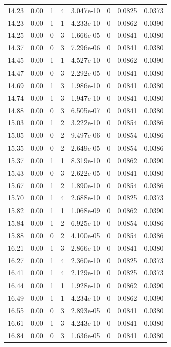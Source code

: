 \documentclass[preview]{standalone}
\begin{document}
{{{\begin{tabular}{L{1.2cm}C{1.2cm} C{0.3cm}C{0.5cm} C{1.4cm}C{1.4cm} C{1.4cm}C{1.4cm}}
  14.23  &  0.00  & 1     &  4 &  3.047e-10  & 0  & 0.0825 &  0.0373   \\ 
  14.23  &  0.00  & 1     &  1 &  4.233e-10  & 0  & 0.0862 &  0.0390   \\ 
  14.25  &  0.00  & 0     &  3 &  1.666e-05  & 0  & 0.0841 &  0.0380   \\ 
  14.37  &  0.00  & 0     &  3 &  7.296e-06  & 0  & 0.0841 &  0.0380   \\ 
  14.45  &  0.00  & 1     &  1 &  4.527e-10  & 0  & 0.0862 &  0.0390   \\ 
  14.47  &  0.00  & 0     &  3 &  2.292e-05  & 0  & 0.0841 &  0.0380   \\ 
  14.69  &  0.00  & 1     &  3 &  1.986e-10  & 0  & 0.0841 &  0.0380   \\ 
  14.74  &  0.00  & 1     &  3 &  1.947e-10  & 0  & 0.0841 &  0.0380   \\ 
  14.88  &  0.00  & 0     &  3 &  6.505e-07  & 0  & 0.0841 &  0.0380   \\ 
  15.03  &  0.00  & 1     &  2 &  3.222e-10  & 0  & 0.0854 &  0.0386   \\ 
  15.05  &  0.00  & 0     &  2 &  9.497e-06  & 0  & 0.0854 &  0.0386   \\ 
  15.35  &  0.00  & 0     &  2 &  2.649e-05  & 0  & 0.0854 &  0.0386   \\ 
  15.37  &  0.00  & 1     &  1 &  8.319e-10  & 0  & 0.0862 &  0.0390   \\ 
  15.43  &  0.00  & 0     &  3 &  2.622e-05  & 0  & 0.0841 &  0.0380   \\ 
  15.67  &  0.00  & 1     &  2 &  1.890e-10  & 0  & 0.0854 &  0.0386   \\ 
  15.70  &  0.00  & 1     &  4 &  2.688e-10  & 0  & 0.0825 &  0.0373   \\ 
  15.82  &  0.00  & 1     &  1 &  1.068e-09  & 0  & 0.0862 &  0.0390   \\ 
  15.84  &  0.00  & 1     &  2 &  6.925e-10  & 0  & 0.0854 &  0.0386   \\ 
  15.88  &  0.00  & 0     &  2 &  4.100e-05  & 0  & 0.0854 &  0.0386   \\ 
  16.21  &  0.00  & 1     &  3 &  2.866e-10  & 0  & 0.0841 &  0.0380   \\ 
  16.27  &  0.00  & 1     &  4 &  2.360e-10  & 0  & 0.0825 &  0.0373   \\ 
  16.41  &  0.00  & 1     &  4 &  2.129e-10  & 0  & 0.0825 &  0.0373   \\ 
  16.44  &  0.00  & 1     &  1 &  1.928e-10  & 0  & 0.0862 &  0.0390   \\ 
  16.49  &  0.00  & 1     &  1 &  4.234e-10  & 0  & 0.0862 &  0.0390   \\ 
  16.55  &  0.00  & 0     &  3 &  2.893e-05  & 0  & 0.0841 &  0.0380   \\ 
  16.61  &  0.00  & 1     &  3 &  4.243e-10  & 0  & 0.0841 &  0.0380   \\ 
  16.84  &  0.00  & 0     &  3 &  1.636e-05  & 0  & 0.0841 &  0.0380   \\ 
\hline 
\end{tabular} 

}}}
\end{document}
